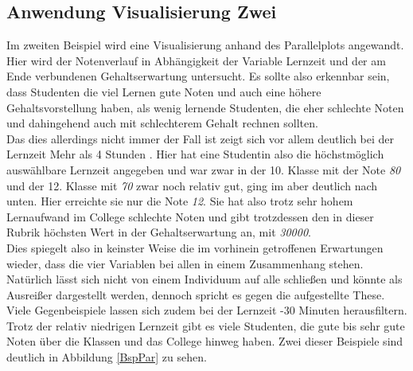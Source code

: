 \documentclass[usegeometry=true]{scrartcl}
\begin{document}
\subsection{Anwendung Visualisierung Zwei}
\label{AnwZwei}
Im zweiten Beispiel wird eine Visualisierung anhand des Parallelplots angewandt. Hier wird der Notenverlauf in Abhängigkeit der Variable Lernzeit und der am Ende verbundenen Gehaltserwartung untersucht. Es sollte also erkennbar sein, dass Studenten die viel Lernen gute Noten und auch eine höhere Gehaltsvorstellung haben, als wenig lernende Studenten, die eher schlechte Noten und dahingehend auch mit schlechterem Gehalt rechnen sollten.\\

\noindent Das dies allerdings nicht immer der Fall ist zeigt sich vor allem deutlich bei der Lernzeit \glqq Mehr als 4 Stunden \grqq . Hier hat eine Studentin also die höchstmöglich auswählbare Lernzeit angegeben und war zwar in der 10. Klasse mit der Note \textit{80} und der 12. Klasse mit \textit{70} zwar noch relativ gut, ging im aber deutlich nach unten. Hier erreichte sie nur die Note \textit{12}. Sie hat also trotz sehr hohem Lernaufwand im College schlechte Noten und gibt trotzdessen den in dieser Rubrik höchsten Wert in der Gehaltserwartung an, mit \textit{30000}.\\

\noindent Dies spiegelt also in keinster Weise die im vorhinein getroffenen Erwartungen wieder, dass die vier Variablen bei allen in einem Zusammenhang stehen.\\
Natürlich lässt sich nicht von einem Individuum auf alle schließen und könnte als Ausreißer dargestellt werden, dennoch spricht es gegen die aufgestellte These.\\

\noindent Viele Gegenbeispiele lassen sich zudem bei der Lernzeit -30 Minuten herausfiltern\grqq . Trotz der relativ niedrigen Lernzeit gibt es viele Studenten, die gute bis sehr gute Noten über die Klassen und das College hinweg haben. Zwei dieser Beispiele sind deutlich in Abbildung \ref{BspPar} zu sehen.
\end{document}
